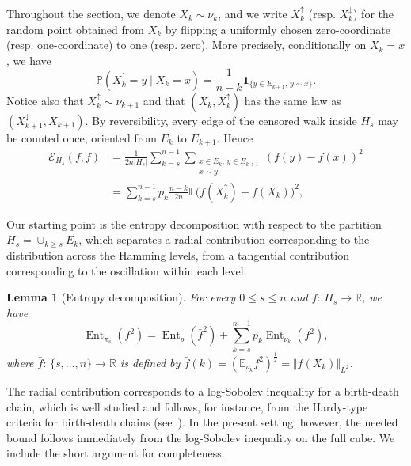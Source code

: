 \documentclass[12pt,final]{amsart}
\newcommand{\1}{\mathbf{1}}
\newtheorem{lemma}[theorem]{Lemma}
\newcommand{\Ent}{\operatorname{Ent}}
\newcommand{\Ecal}{\mathcal{E}}
\newcommand{\R}{\mathbb{R}}
\begin{document}
Throughout the section, we denote $X_k\sim \nu_k$, and we write $X_k^{\uparrow}$ (resp. $X_k^{\downarrow}$) for the random point obtained from $X_k$ by flipping a uniformly chosen zero-coordinate (resp. one-coordinate) to one (resp. zero). More precisely, conditionally on $X_k=x$, we have 
$$
\mathbb{P}(X_k^\uparrow=y\mid X_k=x)
=\frac{1}{n-k}\mathbf 1_{\{y\in E_{k+1},\, y\sim x\}}.
$$
Notice also that $X_k^{\uparrow}\sim\nu_{k+1}$ and that $(X_k,X_k^{\uparrow})$ has the same law as $(X_{k+1}^{\downarrow}, X_{k+1})$. By reversibility, every edge of the censored walk inside $H_s$ may be counted once, oriented from $E_k$ to $E_{k+1}$. Hence
\begin{align}
\Ecal_{H_s}(f,f)&= \frac{1}{2n|H_s|}
\sum_{k=s}^{n-1} \sum_{\substack{x\in E_k,\, y\in E_{k+1}\\ x\sim y}} (f(y)-f(x))^2  \nonumber \\
&=\sum_{k=s}^{n-1} p_k\frac{n-k}{2n}
\mathbb{E}{
\bigl(f(X_k^\uparrow)-f(X_k)\bigr)^2}\label{eq:Dir-up-walk},
\end{align}

Our starting point is the entropy decomposition with respect to the partition $H_s=\cup_{k\geq s}E_{k}$, which separates a radial contribution corresponding to the distribution across the Hamming levels, from a tangential contribution corresponding to the oscillation within each level.  

\begin{lemma}[Entropy decomposition]\label{lem:entropy-decomp}
For every $0\le s \le n$ and $f:\, H_s\to \R$, we have
$$     
\Ent_{\pi_s}(f^2) =\Ent_{p}(\bar{f}^2)+\sum_{k= s}^{n-1}p_{k}\Ent_{\nu_k}(f^2),
$$
where $\bar{f}:\, \{s,\ldots,n\}\to \R$ is defined by $\bar{f}(k)= (\mathbb{E}_{\nu_k}f^2)^{\frac12}=\Vert f(X_k)\Vert_{L^2}$. 
\end{lemma}


The radial contribution corresponds to a log-Sobolev inequality for a birth-death chain, which is well studied and follows, for instance, from the Hardy-type criteria for birth-death chains (see~\cite{Miclo}). In the present setting, however, the needed bound follows immediately from the log-Sobolev inequality on the full cube. We include the short argument for completeness.
\end{document}
